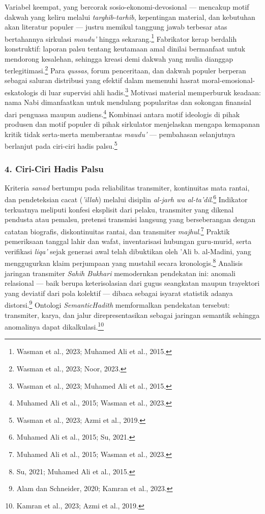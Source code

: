 Variabel keempat, yang bercorak sosio-ekonomi-devosional --- mencakup motif dakwah yang keliru melalui \textit{targhib-tarhib}, kepentingan material, dan kebutuhan akan literatur populer --- justru memikul tanggung jawab terbesar atas bertahannya sirkulasi \textit{maudu'} hingga sekarang.\footnote{Wasman et al., 2023; Muhamed Ali et al., 2015.} Fabrikator kerap berdalih konstruktif: laporan palsu tentang keutamaan amal dinilai bermanfaat untuk mendorong kesalehan, sehingga kreasi demi dakwah yang mulia dianggap terlegitimasi.\footnote{Wasman et al., 2023; Noor, 2023.} Para \textit{qussas}, forum penceritaan, dan dakwah populer berperan sebagai saluran distribusi yang efektif dalam memenuhi hasrat moral-emosional-eskatologis di luar supervisi ahli hadis.\footnote{Wasman et al., 2023; Muhamed Ali et al., 2015.} Motivasi material memperburuk keadaan: nama Nabi dimanfaatkan untuk mendulang popularitas dan sokongan finansial dari penguasa maupun audiens.\footnote{Muhamed Ali et al., 2015; Wasman et al., 2023.} Kombinasi antara motif ideologis di pihak produsen dan motif populer di pihak sirkulator menjelaskan mengapa kemapanan kritik tidak serta-merta memberantas \textit{maudu'} --- pembahasan selanjutnya berlanjut pada ciri-ciri hadis palsu.\footnote{Wasman et al., 2023; Azmi et al., 2019.}

\subsubsection*{4. Ciri-Ciri Hadis Palsu}

Kriteria \textit{sanad} bertumpu pada reliabilitas transmiter, kontinuitas mata rantai, dan pendeteksian cacat (\textit{'illah}) melalui disiplin \textit{al-jarh wa al-ta'dil}.\footnote{Muhamed Ali et al., 2015; Su, 2021.} Indikator terkuatnya meliputi konfesi eksplisit dari pelaku, transmiter yang dikenal pendusta atau pemalsu, pretensi transmisi langsung yang berseberangan dengan catatan biografis, diskontinuitas rantai, dan transmiter \textit{majhul}.\footnote{Muhamed Ali et al., 2015; Wasman et al., 2023.} Praktik pemeriksaan tanggal lahir dan wafat, inventarisasi hubungan guru-murid, serta verifikasi \textit{liqa'} sejak generasi awal telah dibuktikan oleh 'Ali b. al-Madini, yang menggugurkan klaim perjumpaan yang mustahil secara kronologis.\footnote{Su, 2021; Muhamed Ali et al., 2015.} Analisis jaringan transmiter \textit{Sahih Bukhari} memodernkan pendekatan ini: anomali relasional --- baik berupa keterisolasian dari gugus seangkatan maupun trayektori yang deviatif dari pola kolektif --- dibaca sebagai isyarat statistik adanya distorsi.\footnote{Alam dan Schneider, 2020; Kamran et al., 2023.} Ontologi \textit{SemanticHadith} memformalkan pendekatan tersebut: transmiter, karya, dan jalur direpresentasikan sebagai jaringan semantik sehingga anomalinya dapat dikalkulasi.\footnote{Kamran et al., 2023; Azmi et al., 2019.}

